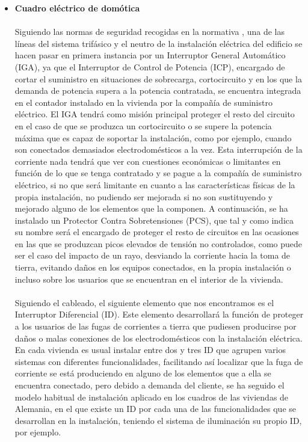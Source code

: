 \begin{itemize}
\item \textbf{Cuadro eléctrico de domótica } \\ \\
Siguiendo las normas de seguridad recogidas en la normativa \cite{Reglamento:2021}, una de las líneas del sistema trifásico y el neutro de la instalación eléctrica del edificio se hacen pasar en primera instancia por un Interruptor General Automático (IGA), ya que el Interruptor de Control de Potencia (ICP), encargado de cortar el suministro en situaciones de sobrecarga, cortocircuito y en los que la demanda de potencia supera a la potencia contratada, se encuentra integrada en el contador instalado en la vivienda por la compañía de suministro eléctrico. El IGA tendrá como misión principal proteger el resto del circuito en el caso de que se produzca un cortocircuito o se supere la potencia máxima que es capaz de soportar la instalación, como por ejemplo, cuando son conectados demasiados electrodomésticos a la vez. Esta interrupción de la corriente nada tendrá que ver con cuestiones económicas o limitantes en función de lo que se tenga contratado y se pague a la compañía de suministro eléctrico, si no que será limitante en cuanto a las características físicas de la propia instalación, no pudiendo ser mejorada si no son sustituyendo y mejorado alguno de los elementos que la componen. A continuación, se ha instalado un Protector Contra Sobretensiones (PCS), que tal y como indica su nombre será el encargado de proteger el resto de circuitos en las ocasiones en las que se produzcan picos elevados de tensión no controlados, como puede ser el caso del impacto de un rayo, desviando la corriente hacia la toma de tierra, evitando daños en los equipos conectados, en la propia instalación o incluso sobre los usuarios que se encuentran en el interior de la vivienda.\\\\
Siguiendo el cableado, el siguiente elemento que nos encontramos es el Interruptor Diferencial (ID). Este elemento desarrollará la función de proteger a los usuarios de las fugas de corrientes a tierra que pudiesen producirse por daños o malas conexiones de los electrodomésticos con la instalación eléctrica. En cada vivienda es usual instalar entre dos y tres ID que agrupen varios sistemas con diferentes funcionalidades, facilitando así localizar que la fuga de corriente se está produciendo en alguno de los elementos que a ella se encuentra conectado, pero debido a demanda del cliente, se ha seguido el modelo habitual de instalación aplicado en los cuadros de las viviendas de Alemania, en el que existe un ID por cada una de las funcionalidades que se desarrollan en la instalación, teniendo el sistema de iluminación su propio ID, por ejemplo. \\\\

\end{itemize}
